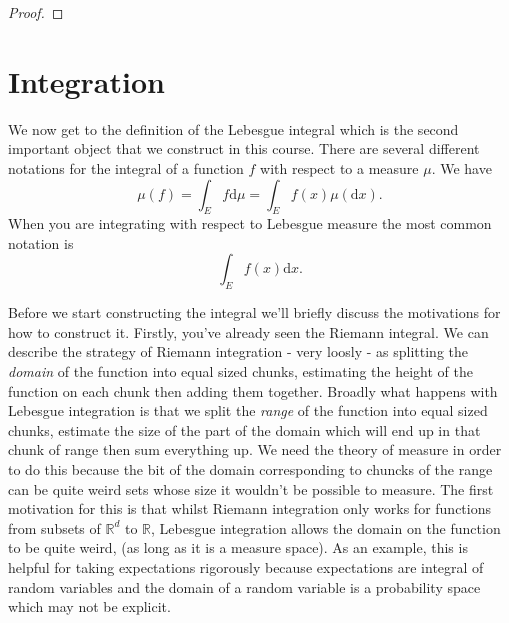 \documentclass[11pt]{article}
\theoremstyle{definition}
\theoremstyle{remark}
\begin{document}
\begin{proof}
\end{proof}

\section{Integration}
We now get to the definition of the Lebesgue integral which is the second important object that we construct in this course. There are several different notations for the integral of a function $f$ with respect to a measure $\mu$. We have
\[ \mu(f) = \int_E f \mathrm{d}\mu = \int_E f(x) \mu(\mathrm{d}x). \] When you are integrating with respect to Lebesgue measure the most common notation is
\[ \int_E f(x)\mathrm{d}x. \]

Before we start constructing the integral we'll briefly discuss the motivations for how to construct it. Firstly, you've already seen the Riemann integral. We can describe the strategy of Riemann integration - very loosly - as splitting the \emph{domain} of the function into equal sized chunks, estimating the height of the function on each chunk then adding them together. Broadly what happens with Lebesgue integration is that we split the \emph{range} of the function into equal sized chunks, estimate the size of the part of the domain which will end up in that chunk of range then sum everything up. We need the theory of measure in order to do this because the bit of the domain corresponding to chuncks of the range can be quite weird sets whose size it wouldn't be possible to measure. The first motivation for this is that whilst Riemann integration only works for functions from subsets of $\mathbb{R}^d$ to $\mathbb{R}$, Lebesgue integration allows the domain on the function to be quite weird, (as long as it is a measure space). As an example, this is helpful for taking expectations rigorously because expectations are integral of random variables and the domain of a random variable is a probability space which may not be explicit.
\end{document}
